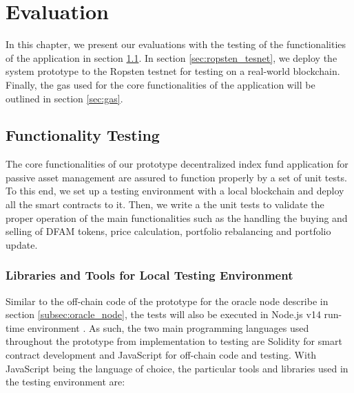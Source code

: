 \chapter{Evaluation}\label{chapter:evaluation}

In this chapter, we present our evaluations with the testing of the functionalities of the application in section \ref{sec:functionality_testing}. In section \ref{sec:ropsten_tesnet}, we deploy the system prototype to the Ropsten testnet for testing on a real-world blockchain. Finally, the gas used for the core functionalities of the application will be outlined in section \ref{sec:gas}.

\section{Functionality Testing} \label{sec:functionality_testing}

The core functionalities of our prototype decentralized index fund application for passive asset management are assured to function properly by a set of unit tests. To this end, we set up a testing environment with a local blockchain and deploy all the smart contracts to it. Then, we write a the unit tests to validate the proper operation of the main functionalities such as the handling the buying and selling of DFAM tokens, price calculation, portfolio rebalancing and portfolio update. 

\subsection{Libraries and Tools for Local Testing Environment}

Similar to the off-chain code of the prototype for the oracle node describe in section \ref{subsec:oracle_node}, the tests will also be executed in Node.js v14 run-time environment . As such, the two main programming languages used throughout the prototype from implementation to testing are Solidity for smart contract development and JavaScript for off-chain code and testing. With JavaScript being the language of choice, the particular tools and libraries used in the testing environment are:

